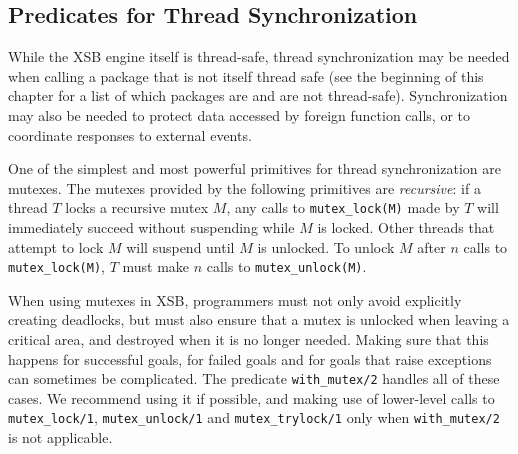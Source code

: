 \subsection{Predicates for Thread Synchronization} \label{sec:mutex}

While the XSB engine itself is thread-safe, thread synchronization may
be needed when calling a package that is not itself thread safe (see
the beginning of this chapter for a list of which packages are and are
not thread-safe).  Synchronization may also be needed to protect data
accessed by foreign function calls, or to coordinate responses to
external events.  

One of the simplest and most powerful primitives for thread
synchronization are mutexes.  The mutexes provided by the following
primitives are {\em recursive}: if a thread $T$ locks a recursive
mutex $M$, any calls to {\tt mutex\_lock(M)} made by $T$ will
immediately succeed without suspending while $M$ is locked.  Other
threads that attempt to lock $M$ will suspend until $M$ is unlocked.
To unlock $M$ after $n$ calls to {\tt mutex\_lock(M)}, $T$ must make
$n$ calls to {\tt mutex\_unlock(M)}.

When using mutexes in XSB, programmers must not only avoid explicitly
creating deadlocks, but must also ensure that a mutex is unlocked when
leaving a critical area, and destroyed when it is no longer needed.
Making sure that this happens for successful goals, for failed goals
and for goals that raise exceptions can sometimes be complicated.  The
predicate {\tt with\_mutex/2} handles all of these cases.  We
recommend using it if possible, and making use of lower-level calls to
{\tt mutex\_lock/1}, {\tt mutex\_unlock/1} and {\tt mutex\_trylock/1}
only when {\tt with\_mutex/2} is not applicable.

